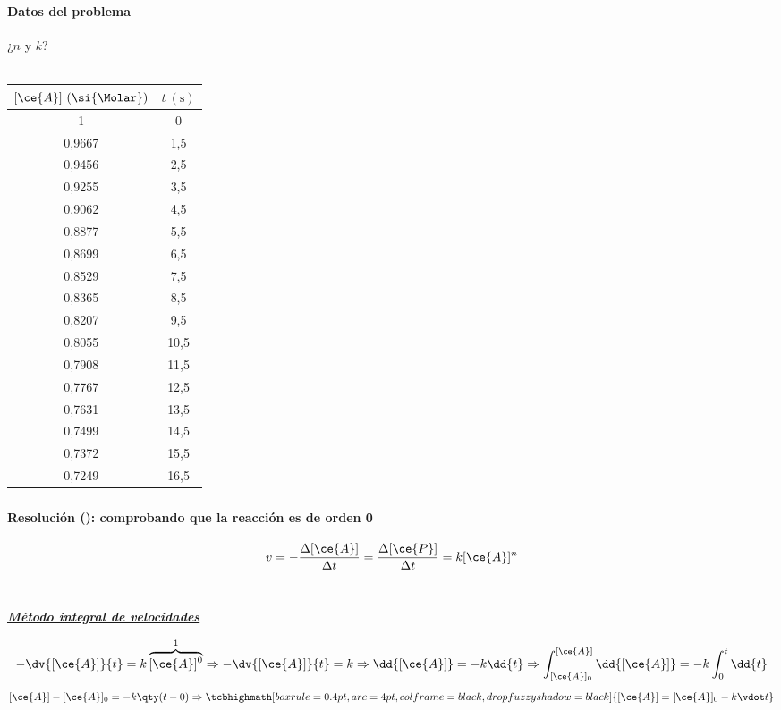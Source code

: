
\begin{frame}
	\frametitle{\ejerciciocmd}
	\framesubtitle{Datos del problema}
	\begin{center}
		{\huge¿$n$ y $k$?}\\[.3cm]
		\\[.3cm]
		\begin{tabular}{SS}
			\toprule
				{$[\ce{A}]~(\si{\Molar})$} & {$t~(\si{\second})$} \\
			      &  0   \\
				0,9667 &  1,5 \\
				0,9456 &  2,5 \\
				0,9255 &  3,5 \\
				0,9062 &  4,5 \\
				0,8877 &  5,5 \\
				0,8699 &  6,5 \\
				0,8529 &  7,5 \\
				0,8365 &  8,5 \\
				0,8207 &  9,5 \\
				0,8055 & 10,5 \\
				0,7908 & 11,5 \\
				0,7767 & 12,5 \\
				0,7631 & 13,5 \\
				0,7499 & 14,5 \\
				0,7372 & 15,5 \\
				0,7249 & 16,5 \\
			\bottomrule
		\end{tabular}
	\end{center}
\end{frame}

\begin{frame}
	\frametitle{\ejerciciocmd}
	\framesubtitle{Resolución (): comprobando que la reacción es de orden 0}
	\quad{}
	$$
		v=-\frac{\Delta[\ce{A}]}{\Delta t}=\frac{\Delta[\ce{P}]}{\Delta t}=k[\ce{A}]^n
	$$\\[.4cm]
	\begin{center}
		{\LARGE\textbf{\textit{\underline{Método integral de velocidades}}}}
	\end{center}
	$$
		-\dv{[\ce{A}]}{t}=k\overbrace{[\ce{A}]^0}^{1}\Rightarrow
		-\dv{[\ce{A}]}{t}=k\Rightarrow\dd{[\ce{A}]}=-k\dd{t}\Rightarrow\int_{[\ce{A}]_0}^{[\ce{A}]}\dd{[\ce{A}]}=-k\int_{0}^{t}\dd{t}
	$$
	$$
		[\ce{A}]-[\ce{A}]_0=-k\qty(t - 0)\Rightarrow
		\tcbhighmath[boxrule=0.4pt,arc=4pt,colframe=black,drop fuzzy shadow=black]{[\ce{A}]=[\ce{A}]_0 - k\vdot t}
	$$
\end{frame}

